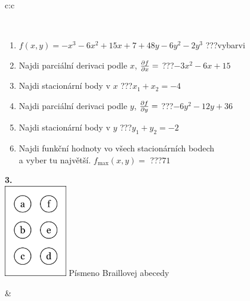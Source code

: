 \documentclass[10pt]{report}
\begin{document}
\begin{tabular}{c:c}
\begin{minipage}[c][104.5mm][t]{0.5\linewidth}
\begin{center}
\begin{minipage}{0.95\linewidth}
\begin{center}
\end{center}
\end{minipage}
\\[1mm]
\begin{minipage}{0.79\linewidth}
\begin{center}
\begin{varwidth}{\linewidth}
\begin{enumerate}
\normalsize
\item $f(x,y)=-x^3-6x^2+15x+7+48y-6y^2-2y^3$\quad \dotfill\; ???\;\dotfill \quad vybarvi
\item Najdi parciální derivaci podle $x$, $\pdv{f}{x}=$\quad \dotfill\; ???\;\dotfill \quad $-3x^2-6x+15$
\item Najdi stacionární body v $x$\quad \dotfill\; ???\;\dotfill \quad $x_1+x_2=-4$
\item Najdi parciální derivaci podle $y$, $\pdv{f}{y}=$\quad \dotfill\; ???\;\dotfill \quad $-6y^2-12y+36$
\item Najdi stacionární body v $y$\quad \dotfill\; ???\;\dotfill \quad $y_1+y_2=-2$
\item Najdi funkční hodnoty vo všech stacionárních bodech \\ \phantom{xxxxxx} a vyber tu najvětší. $f_{\text{max}}(x,y)=$\quad \dotfill\; ???\;\dotfill \quad $71$
\end{enumerate}
\end{varwidth}
\end{center}
\end{minipage}
\begin{minipage}{0.20\linewidth}
\begin{center}
{\Huge\bfseries 3.} \\[2mm]
\includegraphics[height=40mm]{../images/braille.png}
{\small Písmeno Braillovej abecedy}
\end{center}
\end{minipage}
\end{center}
\end{minipage}
&
\begin{minipage}[c][104.5mm][t]{0.5\linewidth}
\begin{center}

\end{center}
\end{minipage}
\end{tabular}
\end{document}
